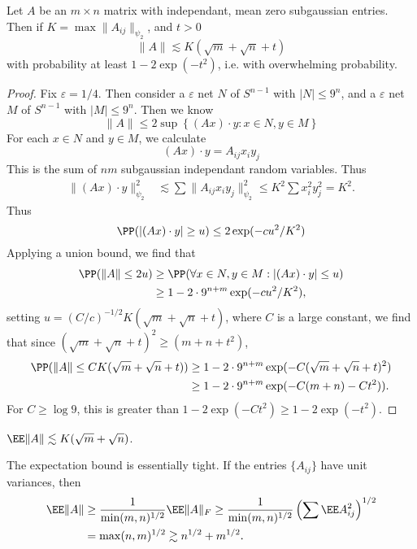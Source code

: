 \begin{theorem}
    Let $A$ be an $m \times n$ matrix with independant, mean zero subgaussian entries. Then if $K = \max \| A_{ij} \|_{\psi_2}$, and $t > 0$
    \[ \| A \| \lesssim K (\sqrt{m} + \sqrt{n} + t) \]
    with probability at least $1 - 2\exp(-t^2)$, i.e. with overwhelming probability.
\end{theorem}
\begin{proof}
    Fix $\varepsilon = 1/4$. Then consider a $\varepsilon$ net $N$ of $S^{n-1}$ with $|N| \leq 9^n$, and a $\varepsilon$ net $M$ of $S^{n-1}$ with $|M| \leq 9^n$. Then we know
    \[ \| A \| \leq 2 \sup \left\{ (Ax) \cdot y : x \in N, y \in M \right\} \]
    For each $x \in N$ and $y \in M$, we calculate
    \[ (Ax) \cdot y = A_{ij} x_i y_j \]
    This is the sum of $nm$ subgaussian independant random variables. Thus
    \begin{align*}
        \| (Ax) \cdot y \|_{\psi_2}^2 &\lesssim \sum \| A_{ij} x_i y_j \|_{\psi_2}^2 \leq K^2 \sum x_i^2 y_j^2 = K^2.
    \end{align*}
    Thus
    \[ \PP(|(Ax) \cdot y| \geq u) \leq 2 \exp(-cu^2/K^2) \]
    Applying a union bound, we find that
    \begin{align*}
        \PP( \| A \| \leq 2u ) &\geq \PP(\forall x \in N, y \in M: |(Ax) \cdot y| \leq u)\\
        &\geq 1 - 2 \cdot 9^{n+m} \exp(-cu^2/K^2),
    \end{align*}
    setting $u = (C/c)^{-1/2} K(\sqrt{m} + \sqrt{n} + t)$, where $C$ is a large constant, we find that since $(\sqrt{m} + \sqrt{n} + t)^2 \geq (m + n + t^2)$,
    \begin{align*}
        \PP( \| A \| \leq CK(\sqrt{m} + \sqrt{n} + t)) &\geq 1 - 2 \cdot 9^{n+m} \exp(-C (\sqrt{m} + \sqrt{n} + t)^2)\\
        &\geq 1 - 2 \cdot 9^{n+m} \exp(-C(m + n) - Ct^2)).
    \end{align*}
    For $C \geq \log 9$, this is greater than $1 - 2 \exp(-Ct^2) \geq 1 - 2 \exp(-t^2)$.
\end{proof}

\begin{corollary}
    $\EE \| A \| \lesssim K (\sqrt{m} + \sqrt{n})$.
\end{corollary}

\begin{remark}
    The expectation bound is essentially tight. If the entries $\{ A_{ij} \}$ have unit variances, then
        \begin{align*}
            \EE \| A \| &\geq \frac{1}{\min(m,n)^{1/2}} \EE \| A \|_F \geq \frac{1}{\min(m,n)^{1/2}} \left(\sum \EE A_{ij}^2 \right)^{1/2}\\
            &= \max(n,m)^{1/2} \gtrsim n^{1/2} + m^{1/2}.
        \end{align*}
\end{remark}

